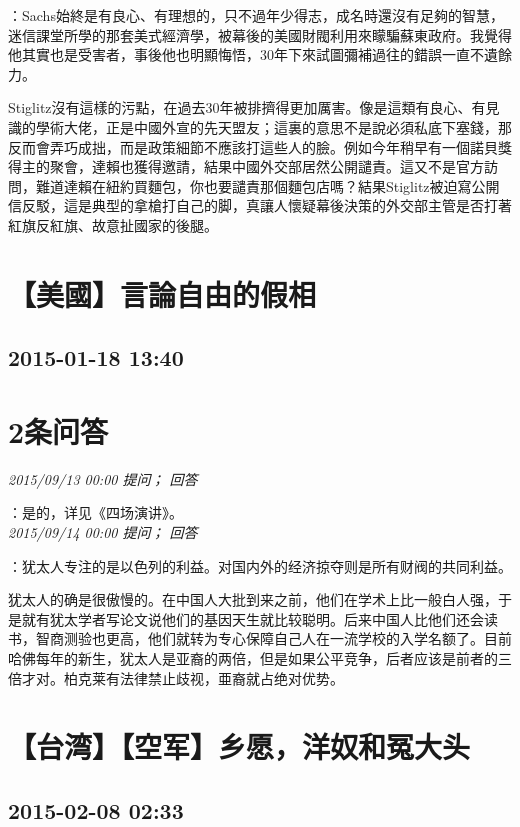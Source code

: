 \documentclass[twocolumn]{ctexart}
\begin{document}
：Sachs始終是有良心、有理想的，只不過年少得志，成名時還沒有足夠的智慧，迷信課堂所學的那套美式經濟學，被幕後的美國財閥利用來矇騙蘇東政府。我覺得他其實也是受害者，事後他也明顯悔悟，30年下來試圖彌補過往的錯誤一直不遺餘力。

Stiglitz沒有這樣的污點，在過去30年被排擠得更加厲害。像是這類有良心、有見識的學術大佬，正是中國外宣的先天盟友；這裏的意思不是說必須私底下塞錢，那反而會弄巧成拙，而是政策細節不應該打這些人的臉。例如今年稍早有一個諾貝獎得主的聚會，達賴也獲得邀請，結果中國外交部居然公開譴責。這又不是官方訪問，難道達賴在紐約買麵包，你也要譴責那個麵包店嗎？結果Stiglitz被迫寫公開信反駁，這是典型的拿槍打自己的脚，真讓人懷疑幕後決策的外交部主管是否打著紅旗反紅旗、故意扯國家的後腿。
\\


\section{【美國】言論自由的假相}
\subsection{2015-01-18 13:40}


\section{2条问答}

\textit{\hfill\noindent\small 2015/09/13 00:00 提问； 回答}

：是的，详见《四场演讲》。\\

\textit{\hfill\noindent\small 2015/09/14 00:00 提问； 回答}

：犹太人专注的是以色列的利益。对国内外的经济掠夺则是所有财阀的共同利益。

犹太人的确是很傲慢的。在中国人大批到来之前，他们在学术上比一般白人强，于是就有犹太学者写论文说他们的基因天生就比较聪明。后来中国人比他们还会读书，智商测验也更高，他们就转为专心保障自己人在一流学校的入学名额了。目前哈佛每年的新生，犹太人是亚裔的两倍，但是如果公平竞争，后者应该是前者的三倍才对。柏克莱有法律禁止歧视，亜裔就占绝对优势。\\


\section{【台湾】【空军】乡愿，洋奴和冤大头}
\subsection{2015-02-08 02:33}
\end{document}
